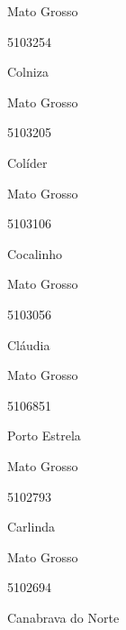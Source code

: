\documentclass[
  letterpaper,
]{report}
\begin{document}
Mato Grosso

\n      

5103254

\n      

Colniza

\n    

\n    

\n      

Mato Grosso

\n      

5103205

\n      

Colíder

\n    

\n    

\n      

Mato Grosso

\n      

5103106

\n      

Cocalinho

\n    

\n    

\n      

Mato Grosso

\n      

5103056

\n      

Cláudia

\n    

\n    

\n      

Mato Grosso

\n      

5106851

\n      

Porto Estrela

\n    

\n    

\n      

Mato Grosso

\n      

5102793

\n      

Carlinda

\n    

\n    

\n      

Mato Grosso

\n      

5102694

\n      

Canabrava do Norte
\end{document}
